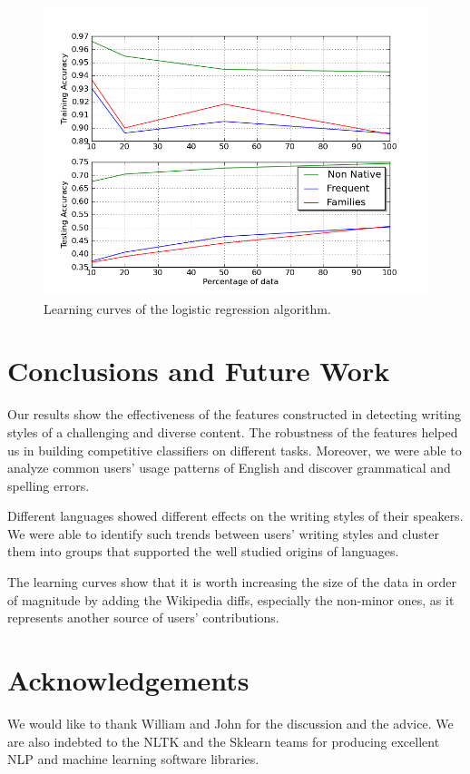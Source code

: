 \documentclass[10pt,a5paper,twoside]{article}
\begin{document}
\begin{figure}[t]
\centering
\includegraphics[scale=0.45]{combined_lc.png}
\caption{Learning curves of the logistic regression algorithm.}
\label{comb_lc}
\end{figure}


\section*{Conclusions and Future Work}
\label{conc}

Our results show the effectiveness of the features constructed in detecting writing styles
of a challenging and diverse content. The robustness of the features helped us
in building competitive classifiers on different tasks. Moreover, we were able
to analyze common users' usage patterns of English and discover grammatical and
spelling errors.

Different languages showed different effects on the writing styles of their
speakers. We were able to identify such trends between users' writing styles and
cluster them into groups that supported the well studied origins of languages.

The learning curves show that it is worth increasing the size
of the data in order of magnitude by adding the Wikipedia diffs, especially the
non-minor ones, as it represents another source of users' contributions.

\section*{Acknowledgements}
We would like to thank William and John for the discussion and the advice.
We are also indebted to the NLTK and the Sklearn teams for producing excellent
NLP and machine learning software libraries.

\newpage
{}

\end{document}
